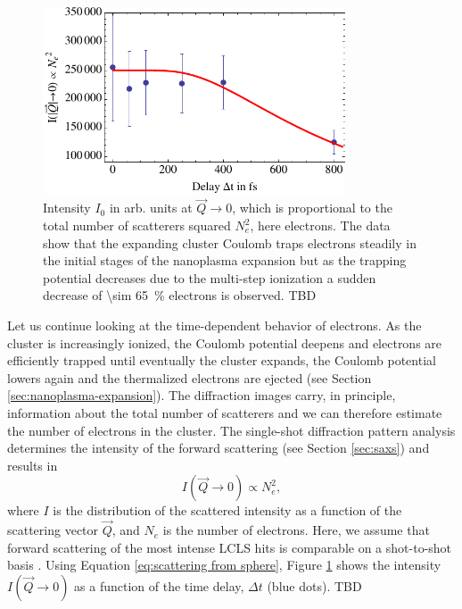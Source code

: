 \begin{figure}
	\centering
		\includegraphics[width=0.80\textwidth]{images/results/number-of-scatterers.pdf}
	\caption[Time-resolved behavior of number of scatterers due to nanoplasma expansion]{Intensity $I_{0}$ in arb. units at $\vec{Q}\rightarrow 0$, which is proportional to the total number of scatterers squared $N_{e}^{2}$, here electrons. The data show that the expanding cluster Coulomb traps electrons steadily in the initial stages of the nanoplasma expansion but as the trapping potential decreases due to the multi-step ionization a sudden decrease of \SI{\sim 65}{\percent} electrons is observed. TBD}
	\label{fig:number-of-scatterer}
\end{figure}
%
Let us continue looking at the time-dependent behavior of electrons. As the cluster is increasingly ionized, the Coulomb potential deepens and electrons are efficiently trapped until eventually the cluster expands, the Coulomb potential lowers again and the thermalized electrons are ejected (see Section \ref{sec:nanoplasma-expansion}). The diffraction images carry, in principle, information about the total number of scatterers and we can therefore estimate the number of electrons in the cluster. The single-shot diffraction pattern analysis determines the intensity of the forward scattering (see Section \ref{sec:saxs}) and results in
\begin{equation}{}
I\left(\vec{Q}\rightarrow 0\right) \propto N_{e}^{2},
\label{eq:}
\end{equation}
where $I$ is the distribution of the scattered intensity as a function of the scattering vector $\vec{Q}$, and $N_{e}$ is the number of electrons. Here, we assume that forward scattering of the most intense LCLS hits is comparable on a shot-to-shot basis \cite{Gorkhover-2012-PRL}. Using Equation \eqref{eq:scattering from sphere}, Figure \ref{fig:number-of-scatterer} shows the intensity $I\left(\vec{Q}\rightarrow 0\right)$ as a function of the time delay, $\Delta t$ (blue dots). TBD
